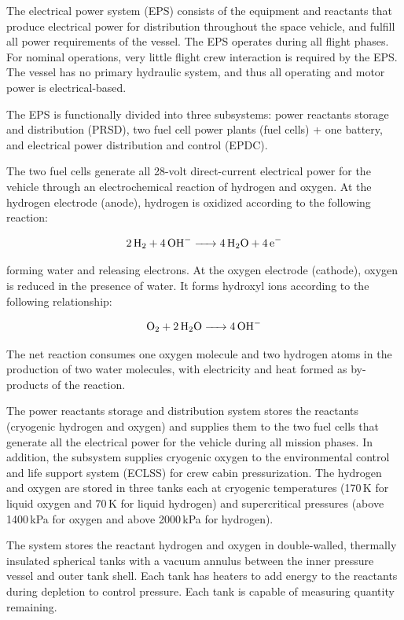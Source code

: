 \documentclass[Orbiter User Manual.tex]{subfiles}
\begin{document}
The electrical power system (EPS) consists of the equipment and reactants that
produce electrical power for distribution throughout the space vehicle, and
fulfill all power requirements of the vessel. The EPS operates during all flight
phases. For nominal operations, very little flight crew interaction is required
by the EPS. The vessel has no primary hydraulic system, and thus all operating
and motor power is electrical-based.

The EPS is functionally divided into three subsystems: power reactants storage
and distribution (PRSD), two fuel cell power plants (fuel cells) + one battery,
and electrical power distribution and control (EPDC).

The two fuel cells generate all 28-volt direct-current electrical power for the
vehicle through an electrochemical reaction of hydrogen and oxygen. At the
hydrogen electrode (anode), hydrogen is oxidized according to the following
reaction:

\begin{align*}
\ce{2H_{2} + 4OH^{-} -> 4H_{2}O + 4e^{-}}
\end{align*}

forming water and releasing electrons. At the oxygen electrode (cathode), oxygen
is reduced in the presence of water. It forms hydroxyl ions according to the
following relationship:

\begin{align*}
\ce{O_{2} + 2H_{2}O -> 4OH^{-}}
\end{align*}

The net reaction consumes one oxygen molecule and two hydrogen atoms in the
production of two water molecules, with electricity and heat formed as
by-products of the reaction.

The power reactants storage and distribution system stores the reactants
(cryogenic hydrogen and oxygen) and supplies them to the two fuel cells that
generate all the electrical power for the vehicle during all mission phases. In
addition, the subsystem supplies cryogenic oxygen to the environmental control
and life support system (ECLSS) for crew cabin pressurization. The hydrogen and
oxygen are stored in three tanks each at cryogenic temperatures (170\,K for
liquid oxygen and 70\,K for liquid hydrogen) and supercritical pressures (above
1400\,kPa for oxygen and above 2000\,kPa for hydrogen).

The system stores the reactant hydrogen and oxygen in double-walled, thermally
insulated spherical tanks with a vacuum annulus between the inner pressure
vessel and outer tank shell. Each tank has heaters to add energy to the
reactants during depletion to control pressure. Each tank is capable of
measuring quantity remaining.
\end{document}
